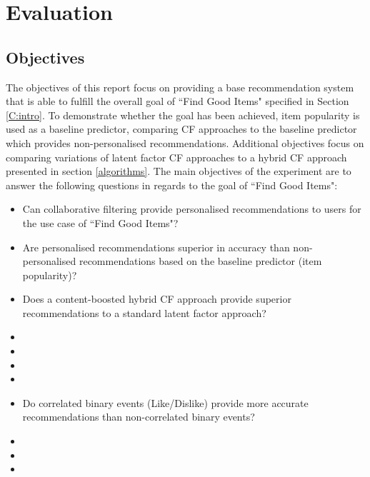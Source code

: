 \chapter{Evaluation}\label{C:evaluation}

\section{Objectives}

The objectives of this report focus on providing a base recommendation system that is able to fulfill the overall goal of ``Find Good Items" specified in Section \ref{C:intro}. To demonstrate whether the goal has been achieved, item popularity is used as a baseline predictor, comparing CF approaches to the baseline predictor which provides non-personalised recommendations. Additional objectives focus on comparing variations of latent factor CF approaches to a hybrid CF approach presented in section \ref{algorithms}. The main objectives of the experiment are to answer the following questions in regards to the goal of ``Find Good Items":

\begin{itemize}
	\item{Can collaborative filtering provide personalised recommendations to users for the use case of ``Find Good Items"?}
	\item{Are personalised recommendations superior in accuracy than non-personalised recommendations based on the baseline predictor (item popularity)?}
	\item{Does a content-boosted hybrid CF approach provide superior recommendations to a standard latent factor approach?}
	\item{}
	\item{}
	\item{}
	\item{}
	\item{Do correlated binary events (Like/Dislike) provide more accurate recommendations than non-correlated binary events?}
	\item{}
	\item{}
	\item{}
\end{itemize}

